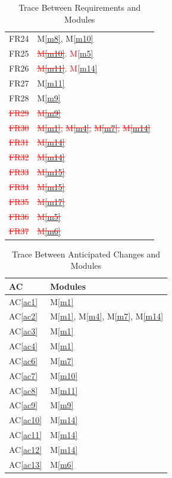 \documentclass[12pt, titlepage]{article}
\newcommand{\acref}[1]{AC\ref{#1}}
\newcommand{\mref}[1]{M\ref{#1}}
\begin{document}
\begin{table}[H]
\begin{tabular}{p{} p{}}
		FR24 & \mref{m8}, \mref{m10}\\
		FR25 & \textcolor{red}{\sout{\mref{m10}}}\textcolor{red}{. \mref{m5}}\\
		FR26 & \textcolor{red}{\sout{\mref{m11}}}\textcolor{red}{. \mref{m14}}\\
		FR27 & \mref{m11}\\
		FR28 & \mref{m9}\\
		\textcolor{red}{\sout{FR29}} & \textcolor{red}{\sout{\mref{m9}}}\\
		\textcolor{red}{\sout{FR30}} & \textcolor{red}{\sout{\mref{m1},}} \textcolor{red}{\sout{\mref{m4},}} \textcolor{red}{\sout{\mref{m7},}} \textcolor{red}{\sout{\mref{m14}}}\\
		\textcolor{red}{\sout{FR31}} & \textcolor{red}{\sout{\mref{m14}}}\\
		\textcolor{red}{\sout{FR32}} & \textcolor{red}{\sout{\mref{m14}}}\\
		\textcolor{red}{\sout{FR33}} & \textcolor{red}{\sout{\mref{m15}}}\\
		\textcolor{red}{\sout{FR34}} & \textcolor{red}{\sout{\mref{m15}}}\\
		\textcolor{red}{\sout{FR35}} & \textcolor{red}{\sout{\mref{m17}}}\\
		\textcolor{red}{\sout{FR36}} & \textcolor{red}{\sout{\mref{m5}}}\\
		\textcolor{red}{\sout{FR37}} & \textcolor{red}{\sout{\mref{m6}}}\\
		\bottomrule
	\end{tabular}
	\caption{Trace Between Requirements and Modules}
	\label{TblRT}
\end{table}

\begin{table}[H]
	\centering
	\begin{tabular}{p{} p{}}
		\toprule
		\textbf{AC} & \textbf{Modules}\\
		\midrule
		\acref{ac1} & \mref{m1}\\
		\acref{ac2} & \mref{m1}, \mref{m4}, \mref{m7}, \mref{m14}\\
		\acref{ac3} & \mref{m1}\\
		\acref{ac4} & \mref{m1}\\
		\acref{ac6} & \mref{m7}\\
		\acref{ac7} & \mref{m10}\\
		\acref{ac8} & \mref{m11}\\
		\acref{ac9} & \mref{m9}\\
		\acref{ac10} & \mref{m14}\\
		\acref{ac11} & \mref{m14}\\
		\acref{ac12} & \mref{m14}\\
		\acref{ac13} & \mref{m6}\\
		\bottomrule
	\end{tabular}
	\caption{Trace Between Anticipated Changes and Modules}
	\label{TblACT}
\end{table}
\end{document}
